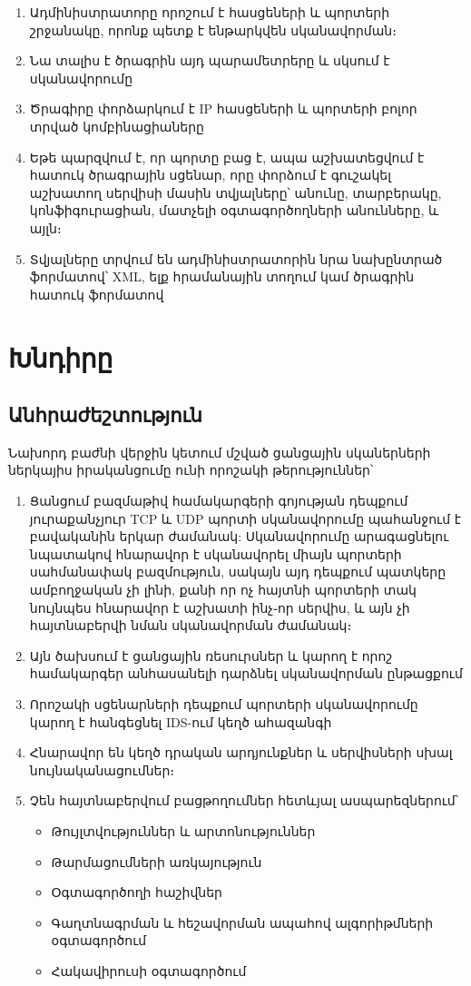 \documentclass[12pt]{article}
\begin{document}
\begin{sloppypar}
\begin{enumerate}
	\begin{enumerate}
	\item Ադմինիստրատորը որոշում է հասցեների և պորտերի շրջանակը, որոնք պետք է
		ենթարկվեն սկանավորման։
	\item Նա տալիս է ծրագրին այդ պարամետրերը և սկսում է սկանավորումը
	\item Ծրագիրը փորձարկում է IP հասցեների և պորտերի բոլոր տրված
		կոմբինացիաները
	\item Եթե պարզվում է, որ պորտը բաց է, ապա աշխատեցվում է հատուկ ծրագրային
		սցենար, որը փորձում է գուշակել աշխատող սերվիսի մասին տվյալները՝
		անունը, տարբերակը, կոնֆիգուրացիան, մատչելի օգտագործողների անունները,
		և այլն։
	\item Տվյալները տրվում են ադմինիստրատորին նրա նախընտրած ֆորմատով՝
		XML, ելք հրամանային տողում կամ ծրագրին հատուկ ֆորմատով
	\end{enumerate}
\end{enumerate}


\section{Խնդիրը}


\subsection{Անհրաժեշտություն}


Նախորդ բաժնի վերջին կետում մշված ցանցային սկաներների ներկայիս իրականցումը
ունի որոշակի թերություններ՝

\begin{enumerate}
\item Ցանցում բազմաթիվ համակարգերի գոյության դեպքում յուրաքանչյուր TCP և
	UDP պորտի սկանավորումը պահանջում է բավականին երկար ժամանակ:
	Սկանավորումը արագացնելու նպատակով հնարավոր է սկանավորել միայն
	պորտերի սահմանափակ բազմություն, սակայն այդ դեպքում պատկերը ամբողջական
	չի լինի, քանի որ ոչ հայտնի պորտերի տակ նույնպես հնարավոր է աշխատի
	ինչ֊որ սերվիս, և այն չի հայտնաբերվի նման սկանավորման ժամանակ։
\item Այն ծախսում է ցանցային ռեսուրսներ և կարող է որոշ համակարգեր
    անհասանելի դարձնել սկանավորման ընթացքում
\item Որոշակի սցենարների դեպքում պորտերի սկանավորումը կարող է
    հանգեցնել IDS-ում կեղծ ահազանգի
\item Հնարավոր են կեղծ դրական արդյունքներ և սերվիսների սխալ
	նույնականացումներ։
\item Չեն հայտնաբերվում բացթողումներ հետևյալ ասպարեզներում՝
	\begin{itemize}
	\item Թույլտվություններ և արտոնություններ
	\item Թարմացումների առկայություն
	\item Օգտագործողի հաշիվներ
	\item Գաղտնագրման և հեշավորման ապահով ալգորիթմների օգտագործում
	\item Հակավիրուսի օգտագործում
	\end{itemize}
\end{enumerate}


\end{sloppypar}
\end{document}
